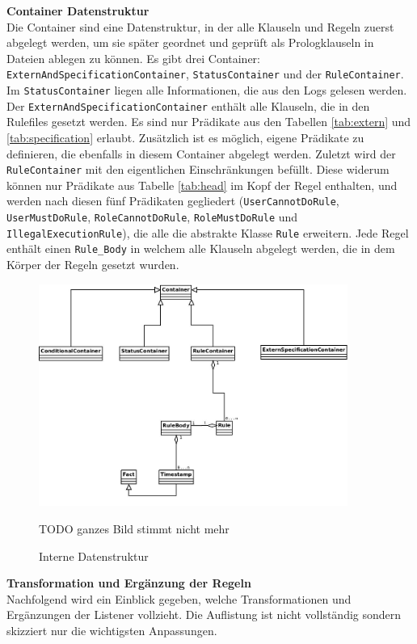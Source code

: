 \textbf{Container Datenstruktur}\\
Die Container sind eine Datenstruktur, in der alle Klauseln und Regeln zuerst abgelegt werden, um sie später geordnet und geprüft als Prologklauseln in Dateien ablegen zu können. Es gibt drei Container: \texttt{ExternAndSpecificationContainer}, \texttt{StatusContainer} und der \texttt{RuleContainer}. Im \texttt{StatusContainer} liegen alle Informationen, die aus den Logs gelesen werden. \newline
Der \texttt{ExternAndSpecificationContainer} enthält alle Klauseln, die in den Rulefiles gesetzt werden. Es sind nur Prädikate aus den Tabellen \ref{tab:extern} und \ref{tab:specification} erlaubt. Zusätzlich ist es möglich, eigene Prädikate zu definieren, die ebenfalls in diesem Container abgelegt werden. Zuletzt wird der \texttt{RuleContainer} mit den eigentlichen Einschränkungen befüllt. Diese widerum können nur Prädikate aus Tabelle \ref{tab:head} im Kopf der Regel enthalten, und werden nach diesen fünf Prädikaten gegliedert (\texttt{UserCannotDoRule}, \texttt{UserMustDoRule}, \texttt{RoleCannotDoRule}, \texttt{RoleMustDoRule} und \newline
\texttt{IllegalExecutionRule}), die alle die abstrakte Klasse \texttt{Rule} erweitern. Jede Regel enthält einen \texttt{Rule\_Body} in welchem alle Klauseln abgelegt werden, die in dem Körper der Regeln gesetzt wurden. 


\begin{figure}[ht]
	\centering
  \includegraphics[width=0.9\textwidth]{Figures/Container}
	\caption{Interne Datenstruktur}
TODO ganzes Bild stimmt nicht mehr
	\label{fig:container}
\end{figure}

\textbf{Transformation und Ergänzung der Regeln}\\
Nachfolgend wird ein Einblick gegeben, welche Transformationen und Ergänzungen der Listener vollzieht. Die Auflistung ist nicht vollständig sondern skizziert nur die wichtigsten Anpassungen.

